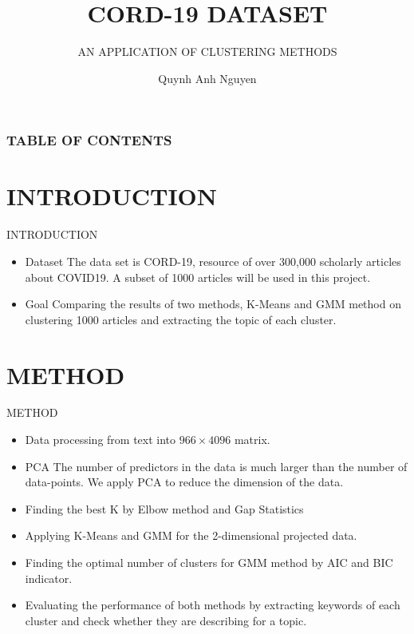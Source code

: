 \documentclass[9pt]{beamer}
\title{CORD-19 DATASET}
\subtitle{AN APPLICATION OF CLUSTERING METHODS}
\author{Quynh Anh Nguyen }
\institute{University of Milan}
\begin{document}
\titlepage

\begin{frame}

 \frametitle{TABLE OF CONTENTS}
 \tableofcontents
\end{frame}

\section{INTRODUCTION} %
\begin{frame}{INTRODUCTION}%
\begin{itemize}

  \setlength\itemsep{2em}  %
  
    \item{Dataset} The data set is CORD-19, resource of over 300,000 scholarly articles about COVID19. A subset of 1000 articles will be used in this project.
    
     \item{Goal} Comparing the results of two methods, K-Means and GMM method on clustering 1000 articles and extracting the topic of each cluster.
    
\end{itemize}
    
\end{frame}
\section{METHOD} %
\begin{frame}{METHOD}%
\begin{itemize}

  \setlength\itemsep{1.5em}  %
  \item Data processing from text into $966\times4096$ matrix.
    \item{PCA }
The number of predictors in the data is much larger than the number of data-points. We apply PCA to reduce the dimension of the data.
    
   \item Finding the best K by Elbow method and Gap Statistics
   
   \item Applying K-Means and GMM for the 2-dimensional projected data.
   
   \item Finding the optimal number of clusters for GMM method by AIC and BIC indicator.
   
   \item Evaluating the performance of both methods by extracting keywords of each cluster and check whether they are describing for a topic. 
    
\end{itemize}
\end{frame}
\end{document}
